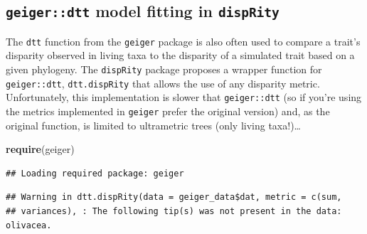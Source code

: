 \documentclass[]{book}
\newenvironment{Shaded}{\begin{snugshade}}{\end{snugshade}}
\newcommand{\KeywordTok}[1]{\textcolor[rgb]{0.13,0.29,0.53}{\textbf{#1}}}
\newcommand{\DataTypeTok}[1]{\textcolor[rgb]{0.13,0.29,0.53}{#1}}
\newcommand{\DecValTok}[1]{\textcolor[rgb]{0.00,0.00,0.81}{#1}}
\newcommand{\StringTok}[1]{\textcolor[rgb]{0.31,0.60,0.02}{#1}}
\newcommand{\OperatorTok}[1]{\textcolor[rgb]{0.81,0.36,0.00}{\textbf{#1}}}
\newcommand{\NormalTok}[1]{#1}
\theoremstyle{definition}
\theoremstyle{definition}
\theoremstyle{remark}
\begin{document}
\subsection{\texorpdfstring{\texttt{geiger::dtt} model fitting in
\texttt{dispRity}}{geiger::dtt model fitting in dispRity}}\label{geigerdtt-model-fitting-in-disprity}

The \texttt{dtt} function from the \texttt{geiger} package is also often
used to compare a trait's disparity observed in living taxa to the
disparity of a simulated trait based on a given phylogeny. The
\texttt{dispRity} package proposes a wrapper function for
\texttt{geiger::dtt}, \texttt{dtt.dispRity} that allows the use of any
disparity metric. Unfortunately, this implementation is slower that
\texttt{geiger::dtt} (so if you're using the metrics implemented in
\texttt{geiger} prefer the original version) and, as the original
function, is limited to ultrametric trees (only living taxa!)\ldots{}

\begin{Shaded}
\begin{Highlighting}[]
\KeywordTok{require}\NormalTok{(geiger)}
\end{Highlighting}
\end{Shaded}

\begin{verbatim}
## Loading required package: geiger
\end{verbatim}

\begin{Shaded}
\end{Shaded}

\begin{verbatim}
## Warning in dtt.dispRity(data = geiger_data$dat, metric = c(sum,
## variances), : The following tip(s) was not present in the data: olivacea.
\end{verbatim}
\end{document}
